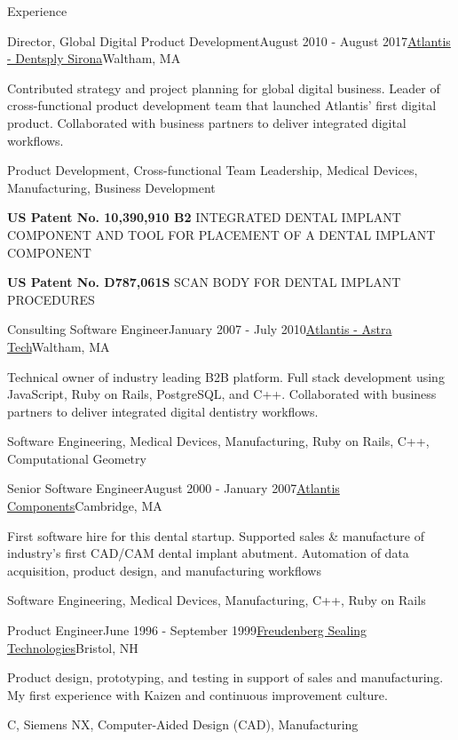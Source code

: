 \documentclass{resume}
\begin{document}
\begin{rSection}{Experience}
\begin{rSubsection}{Director, Global Digital Product Development}{August 2010 - August 2017}{\href{https://dentsplysirona.com}{Atlantis - Dentsply Sirona}}{Waltham, MA}
\item Contributed strategy and project planning for global digital business. Leader of cross-functional product development team that launched Atlantis' first digital product. Collaborated with business partners to deliver integrated digital workflows.
\item Product Development, Cross-functional Team Leadership, Medical Devices, Manufacturing, Business Development
\item \textbf{US Patent No. 10,390,910 B2} INTEGRATED DENTAL IMPLANT COMPONENT AND TOOL FOR PLACEMENT OF A DENTAL IMPLANT COMPONENT
\item \textbf{US Patent No. D787,061S} SCAN BODY FOR DENTAL IMPLANT PROCEDURES
\end{rSubsection}

\begin{rSubsection}{Consulting Software Engineer}{January 2007 - July 2010}{\href{https://dentsplysirona.com}{Atlantis - Astra Tech}}{Waltham, MA}
\item Technical owner of industry leading B2B platform. Full stack development using JavaScript, Ruby on Rails, PostgreSQL, and C++. Collaborated with business partners to deliver integrated digital dentistry workflows.
\item Software Engineering, Medical Devices, Manufacturing, Ruby on Rails, C++, Computational Geometry
\end{rSubsection}

\begin{rSubsection}{Senior Software Engineer}{August 2000 - January 2007}{\href{https://dentsplysirona.com}{Atlantis Components}}{Cambridge, MA}
\item First software hire for this dental startup. Supported sales \& manufacture of industry's first CAD/CAM dental implant abutment. Automation of data acquisition, product design, and manufacturing workflows
\item Software Engineering, Medical Devices, Manufacturing, C++, Ruby on Rails
\end{rSubsection}

\begin{rSubsection}{Product Engineer}{June 1996 - September 1999}{\href{https://fst.com}{Freudenberg Sealing Technologies}}{Bristol, NH}
\item Product design, prototyping, and testing in support of sales and manufacturing. My first experience with Kaizen and continuous improvement culture.
\item C, Siemens NX, Computer-Aided Design (CAD), Manufacturing
\end{rSubsection}

\end{rSection}
\end{document}
